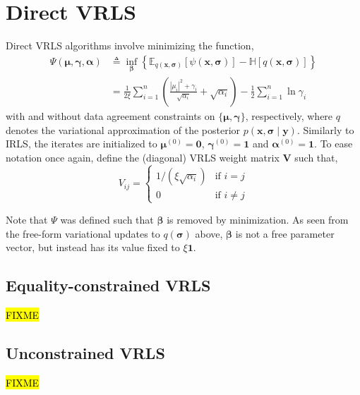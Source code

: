 \documentclass{article}
\newcommand{\m}[1]{\boldsymbol{#1}}
\newcommand{\E}[2]{\mathbb{E}_{#2}\left[ #1 \right]}
\newcommand{\entropy}[1]{\mathbb{H}\left[ #1 \right]}
\begin{document}
\section{Direct VRLS}
\label{s:vrls}
Direct VRLS algorithms involve minimizing the function,
\begin{equation}
\begin{aligned}
\Psi(\m{\mu}, \m{\gamma}, \m{\alpha}) &\triangleq
 \inf_{\m{\beta}} \left\{
  \E{\psi(\m{x}, \m{\sigma})}{q(\m{x}, \m{\sigma})} -
  \entropy{q(\m{x}, \m{\sigma})}
 \right\}
\\ &=
 \frac{1}{2 \xi} \sum_{i=1}^n \left(
  \frac{|\mu_i|^2 + \gamma_i}{\sqrt{\alpha_i}} + \sqrt{\alpha_i}
 \right)
 -\frac{1}{2} \sum_{i=1}^n \ln \gamma_i
\end{aligned}
\label{eq:psibar}
\end{equation}
with and without data agreement constraints on $\{\m{\mu}, \m{\gamma}\}$,
respectively, where $q$ denotes the variational approximation of the
posterior $p(\m{x}, \m{\sigma} \mid \m{y})$. Similarly to IRLS, the iterates
are initialized to $\m{\mu}^{(0)} = \m{0}$, $\m{\gamma}^{(0)} = \m{1}$ and
$\m{\alpha}^{(0)} = \m{1}$. To ease notation once again, define
the (diagonal) VRLS weight matrix $\m{V}$ such that,
\begin{equation}
V_{ij} = \begin{cases}
 1/(\xi \sqrt{\alpha_i}) &\text{if } i = j \\
 0 &\text{if } i \ne j
\end{cases}
\label{eq:vmatrix}
\end{equation}

Note that $\Psi$ was defined such that $\m{\beta}$ is removed by
minimization. As seen from the free-form variational updates to
$q(\m{\sigma})$ above, $\m{\beta}$ is not a free parameter vector,
but instead has its value fixed to $\xi \m{1}$.

\subsection{Equality-constrained VRLS}
\hl{FIXME}

\subsection{Unconstrained VRLS}
\hl{FIXME}
\end{document}
